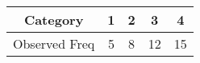 \begin{tabular}{|c|c|c|c|c|}
\hline
Category & 1 & 2 & 3 & 4 \\ 
\hline
Observed Freq & 5 & 8 & 12 & 15 \\
\hline
\end{tabular}